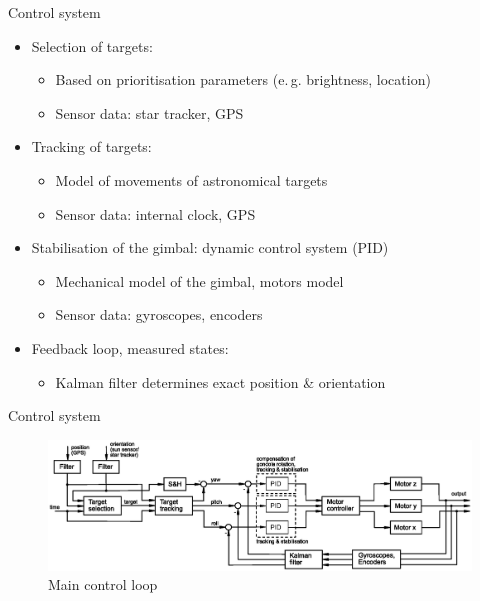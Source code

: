 \documentclass[11pt, aspectratio=169]{beamer}
\begin{document}
\begin{frame}{Control system}
    \begin{itemize}
        \item<1-> Selection of targets: %
        \begin{itemize}
            \item Based on prioritisation parameters (e.\,g. brightness, location)
            \item Sensor data: star tracker, GPS %
        \end{itemize}
        \item<2-> Tracking of targets: 
        \begin{itemize}
            \item Model of movements of astronomical targets
            \item Sensor data: internal clock, GPS
        \end{itemize}
        \item<3-> Stabilisation of the gimbal: dynamic control system (PID) %
        \begin{itemize}
            \item Mechanical model of the gimbal, motors model
            \item Sensor data: gyroscopes, encoders%
        \end{itemize}
        \item<4-> Feedback loop, measured states: 
        \begin{itemize}
            \item Kalman filter determines exact position \& orientation
        \end{itemize}
    \end{itemize}
\end{frame}

\begin{frame}[t]{Control system}
    \begin{figure}
        \includegraphics[width=\linewidth]{figures/images/Control_loop.eps}
        \caption{Main control loop}
    \end{figure}
\end{frame}
\end{document}

